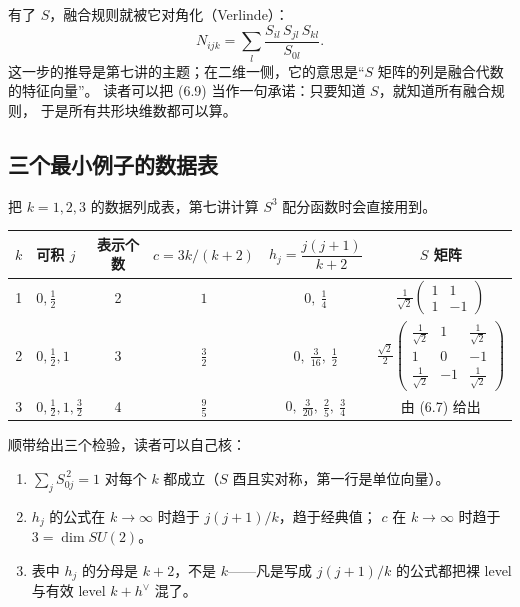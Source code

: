 有了 $S$，融合规则就被它对角化（Verlinde）：
\begin{equation}
N_{ijk}=\sum_{l}\frac{S_{il}\,S_{jl}\,S_{kl}}{S_{0l}} . \tag{6.9}
\end{equation}
这一步的推导是第七讲的主题；在二维一侧，它的意思是“$S$ 矩阵的列是融合代数的特征向量”。
读者可以把 (6.9) 当作一句承诺：只要知道 $S$，就知道所有融合规则，
于是所有共形块维数都可以算。

\subsection{三个最小例子的数据表}

把 $k=1,2,3$ 的数据列成表，第七讲计算 $S^3$ 配分函数时会直接用到。

\begin{center}
\small
\begin{tabular}{@{}clcccc@{}}
\toprule
$k$ & 可积 $j$ & 表示个数 & $c=3k/(k+2)$ & $h_j=\dfrac{j(j+1)}{k+2}$ & $S$ 矩阵 \\
\midrule
1 & $0,\frac12$ & 2 & $1$ & $0,\ \frac14$ & $\frac{1}{\sqrt2}\begin{pmatrix}1&1\\1&-1\end{pmatrix}$ \\
2 & $0,\frac12,1$ & 3 & $\frac32$ & $0,\ \frac{3}{16},\ \frac12$ & $\frac{\sqrt2}{2}\begin{pmatrix}\frac{1}{\sqrt2}&1&\frac{1}{\sqrt2}\\1&0&-1\\ \frac{1}{\sqrt2}&-1&\frac{1}{\sqrt2}\end{pmatrix}$ \\
3 & $0,\frac12,1,\frac32$ & 4 & $\frac95$ & $0,\ \frac{3}{20},\ \frac25,\ \frac34$ & 由 (6.7) 给出 \\
\bottomrule
\end{tabular}
\end{center}

顺带给出三个检验，读者可以自己核：
\begin{enumerate}[leftmargin=*]
  \item $\sum_jS_{0j}^{\,2}=1$ 对每个 $k$ 都成立（$S$ 酉且实对称，第一行是单位向量）。
  \item $h_j$ 的公式在 $k\to\infty$ 时趋于 $j(j+1)/k$，趋于经典值；
        $c$ 在 $k\to\infty$ 时趋于 $3=\dim SU(2)$。
  \item 表中 $h_j$ 的分母是 $k+2$，不是 $k$——凡是写成 $j(j+1)/k$ 的公式都把裸 level
        与有效 level $k+h^\vee$ 混了。
\end{enumerate}

